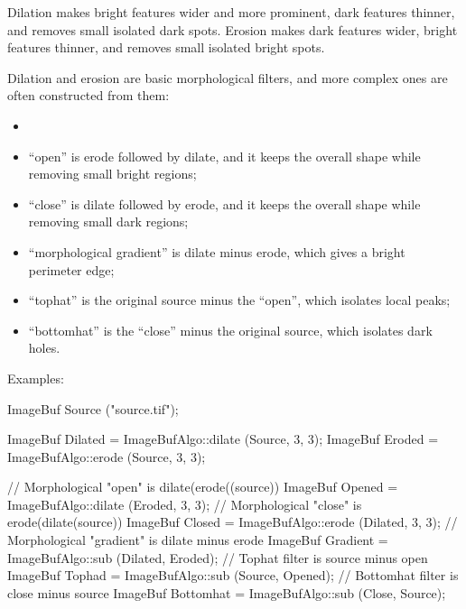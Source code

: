 Dilation makes bright features wider and more prominent, dark features
thinner, and removes small isolated dark spots. Erosion makes dark features
wider, bright features thinner, and removes small isolated bright spots.

Dilation and erosion are basic morphological filters, and more complex ones
are often constructed from them:
\begin{itemize}
\item
\item ``open'' is erode followed by dilate, and it keeps the overall shape
while removing small bright regions;
\item ``close'' is dilate followed by erode, and it keeps the overall shape
while removing small dark regions;
\item ``morphological gradient'' is dilate minus erode, which gives a
bright perimeter edge;
\item ``tophat'' is the original source minus the ``open'', which isolates
local peaks;
\item ``bottomhat'' is the ``close'' minus the original source, which
isolates dark holes.
\end{itemize}

\smallskip
\noindent Examples:
\begin{code}
    ImageBuf Source ("source.tif");

    ImageBuf Dilated = ImageBufAlgo::dilate (Source, 3, 3);
    ImageBuf Eroded  = ImageBufAlgo::erode (Source, 3, 3);

    // Morphological "open" is dilate(erode((source))
    ImageBuf Opened = ImageBufAlgo::dilate (Eroded, 3, 3);
    // Morphological "close" is erode(dilate(source))
    ImageBuf Closed = ImageBufAlgo::erode (Dilated, 3, 3);
    // Morphological "gradient" is dilate minus erode
    ImageBuf Gradient = ImageBufAlgo::sub (Dilated, Eroded);
    // Tophat filter is source minus open
    ImageBuf Tophad = ImageBufAlgo::sub (Source, Opened);
    // Bottomhat filter is close minus source
    ImageBuf Bottomhat = ImageBufAlgo::sub (Close, Source);
\end{code}

